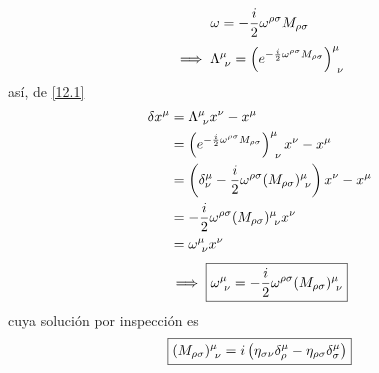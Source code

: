 \begin{equation}
  \omega=-\frac{i}{2}\omega^{\rho\sigma }M_{\rho\sigma }
\end{equation}
\begin{equation}
  \implies \Lambda^\mu_{~\nu } =\left(e^{-\frac{i}{2}\omega^{\rho\sigma }M_{\rho\sigma }}\right)^\mu_{~\nu }
\end{equation}
así, de \eqref{12.1}
\begin{align}
  \delta x^\mu &=\Lambda^\mu_{~\nu } x^\nu-x^\mu \\
  &=\left(e^{-\frac{i}{2}\omega^{\rho\sigma }M_{\rho\sigma }}\right)^\mu_{~\nu }x^\nu -x^\mu \\
  &=\left(\delta^\mu_\nu -\frac{i}{2}\omega^{\rho\sigma }(M_{\rho\sigma })^\mu_{~\nu }\right)x^\nu -x^\mu \\
  &=-\frac{i}{2}\omega^{\rho\sigma }(M_{\rho\sigma })^\mu_{~\nu }x^\nu \\
  &=\omega^\mu_{~\nu } x^\nu 
\end{align}
\begin{equation}
  \implies \boxed{\omega^\mu_{~\nu } =-\frac{i}{2}\omega^{\rho\sigma }(M_{\rho\sigma })^\mu_{~\nu }}
\end{equation}
cuya solución por inspección es
\begin{equation}
	\boxed{(M_{\rho\sigma })^\mu_{~\nu }=i\left(\eta_{\sigma\nu }\delta^\mu_\rho-\eta_{\rho\sigma}\delta^\mu_\sigma \right)}
\end{equation}


























































